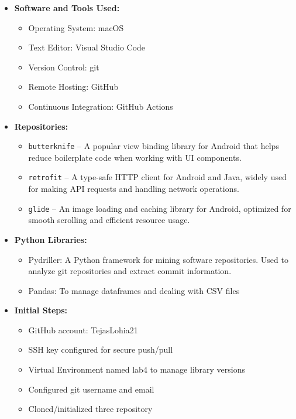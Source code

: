 \documentclass[12pt,a4paper]{article}
\begin{document}
\begin{itemize}
    \item \textbf{Software and Tools Used:}
    \begin{itemize}
        \item Operating System: macOS
        \item Text Editor: Visual Studio Code
        \item Version Control: git
        \item Remote Hosting: GitHub
        \item Continuous Integration: GitHub Actions
    \end{itemize}
    \item \textbf{Repositories:}
    \begin{itemize}
        \item \texttt{butterknife} -- A popular view binding library for Android that helps reduce boilerplate code when working with UI components. 
        \item \texttt{retrofit} -- A type-safe HTTP client for Android and Java, widely used for making API requests and handling network operations.
        \item \texttt{glide} -- An image loading and caching library for Android, optimized for smooth scrolling and efficient resource usage.
    \end{itemize}
    \item \textbf{Python Libraries:}
    \begin{itemize}
        \item Pydriller: A Python framework for mining software repositories. Used to analyze git repositories and extract commit information.
        \item Pandas: To manage dataframes and dealing with CSV files
    \end{itemize}
    \item \textbf{Initial Steps:}
    \begin{itemize}
        \item GitHub account: TejasLohia21
        \item SSH key configured for secure push/pull
        \item Virtual Environment named lab4 to manage library versions
        \item Configured git username and email
        \item Cloned/initialized three repository
    \end{itemize}
\end{itemize}
\end{document}

